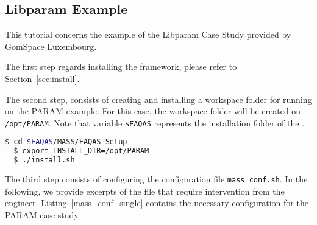 
\newpage
\subsection{Libparam Example}
\label{sec:single_machine_libparam}

This tutorial concerns the example of the Libparam Case Study provided by GomSpace Luxembourg.

The first step regards installing the \MASS framework, please refer to Section~\ref{sec:install}.

The second step, consists of creating and installing a workspace folder for running \MASS on the PARAM example. For this case, the workspace folder will be created on \texttt{/opt/PARAM}. Note that variable \texttt{\$FAQAS} represents the installation folder of the \FAQAS.

\begin{lstlisting}[language=bash]
  $ cd $FAQAS/MASS/FAQAS-Setup
  $ export INSTALL_DIR=/opt/PARAM
  $ ./install.sh
\end{lstlisting}

The third step consists of configuring the \MASS configuration file \texttt{mass\_conf.sh}. In the following, we provide excerpts of the file that require intervention from the engineer. Listing~\ref{mass_conf_single} contains the necessary configuration for the PARAM case study.

